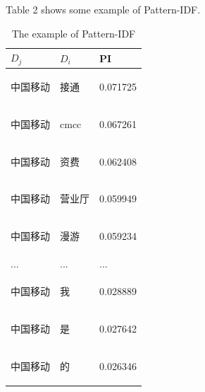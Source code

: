 \documentclass{sig-alternate}
\begin{document}
Table 2 shows some example of Pattern-IDF.
\begin{table}[]
\centering
\caption{The example of Pattern-IDF}
\label{my-label}
\begin{tabular}{lll}
\hline
 $D_j$ & $D_i$ & PI \\ \hline
 \begin{CJK}{UTF8}{gbsn}中国移动\end{CJK} & \begin{CJK}{UTF8}{gbsn}接通\end{CJK}   & 0.071725 \\ \hline
 \begin{CJK}{UTF8}{gbsn}中国移动\end{CJK} & cmcc                                  & 0.067261 \\ \hline
 \begin{CJK}{UTF8}{gbsn}中国移动\end{CJK} & \begin{CJK}{UTF8}{gbsn}资费\end{CJK}   & 0.062408 \\ \hline
 \begin{CJK}{UTF8}{gbsn}中国移动\end{CJK} & \begin{CJK}{UTF8}{gbsn}营业厅\end{CJK} & 0.059949 \\ \hline
 \begin{CJK}{UTF8}{gbsn}中国移动\end{CJK} & \begin{CJK}{UTF8}{gbsn}漫游\end{CJK}   & 0.059234 \\ \hline
 ... & ...  & ...  \\ \hline
 \begin{CJK}{UTF8}{gbsn}中国移动\end{CJK} & \begin{CJK}{UTF8}{gbsn}我\end{CJK}    & 0.028889 \\ \hline
 \begin{CJK}{UTF8}{gbsn}中国移动\end{CJK} & \begin{CJK}{UTF8}{gbsn}是\end{CJK}    & 0.027642 \\ \hline
 \begin{CJK}{UTF8}{gbsn}中国移动\end{CJK} & \begin{CJK}{UTF8}{gbsn}的\end{CJK}    & 0.026346 \\ \hline
\end{tabular}
\end{table}
\end{document}

